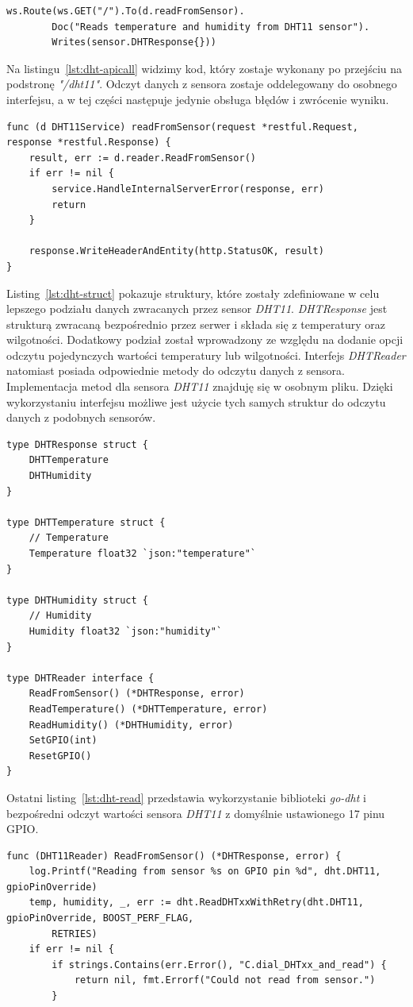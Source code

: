\documentclass[12pt]{report}
\begin{document}
{\begin{lstlisting}[language=golang,caption=Konfiguracja API,label=lst:dht-api]
	ws.Route(ws.GET("/").To(d.readFromSensor).
		Doc("Reads temperature and humidity from DHT11 sensor").
		Writes(sensor.DHTResponse{}))
\end{lstlisting}

\noindent Na listingu~\ref{lst:dht-apicall} widzimy kod, który zostaje wykonany po przejściu na podstronę \textit{"/dht11"}. Odczyt danych z sensora zostaje oddelegowany do osobnego interfejsu, a w tej części następuje jedynie obsługa błędów i zwrócenie wyniku.
\begin{lstlisting}[language=golang,caption=Wywołanie kodu API,label=lst:dht-apicall]
func (d DHT11Service) readFromSensor(request *restful.Request, response *restful.Response) {
	result, err := d.reader.ReadFromSensor()
	if err != nil {
		service.HandleInternalServerError(response, err)
		return
	}

	response.WriteHeaderAndEntity(http.StatusOK, result)
}
\end{lstlisting}

\noindent Listing~\ref{lst:dht-struct} pokazuje struktury, które zostały zdefiniowane w celu lepszego podziału danych zwracanych przez sensor \textit{DHT11}. \textit{DHTResponse} jest strukturą zwracaną bezpośrednio przez serwer i składa się z temperatury oraz wilgotności. Dodatkowy podział został wprowadzony ze względu na dodanie opcji odczytu pojedynczych wartości temperatury lub wilgotności. Interfejs \textit{DHTReader} natomiast posiada odpowiednie metody do odczytu danych z sensora. Implementacja metod dla sensora \textit{DHT11} znajduję się w osobnym pliku. Dzięki wykorzystaniu interfejsu możliwe jest użycie tych samych struktur do odczytu danych z podobnych sensorów.
\begin{lstlisting}[language=golang,caption=Struktury odpowiedzi serwera,label=lst:dht-struct]
type DHTResponse struct {
	DHTTemperature
	DHTHumidity
}

type DHTTemperature struct {
	// Temperature
	Temperature float32 `json:"temperature"`
}

type DHTHumidity struct {
	// Humidity
	Humidity float32 `json:"humidity"`
}

type DHTReader interface {
	ReadFromSensor() (*DHTResponse, error)
	ReadTemperature() (*DHTTemperature, error)
	ReadHumidity() (*DHTHumidity, error)
	SetGPIO(int)
	ResetGPIO()
}
\end{lstlisting}

\noindent Ostatni listing~\ref{lst:dht-read} przedstawia wykorzystanie biblioteki \textit{go-dht} i bezpośredni odczyt wartości sensora \textit{DHT11} z domyślnie ustawionego 17 pinu GPIO.
\begin{lstlisting}[language=golang,caption=Odczyt danych z sensora DHT11,label=lst:dht-read]
func (DHT11Reader) ReadFromSensor() (*DHTResponse, error) {
	log.Printf("Reading from sensor %s on GPIO pin %d", dht.DHT11, gpioPinOverride)
	temp, humidity, _, err := dht.ReadDHTxxWithRetry(dht.DHT11, gpioPinOverride, BOOST_PERF_FLAG,
		RETRIES)
	if err != nil {
		if strings.Contains(err.Error(), "C.dial_DHTxx_and_read") {
			return nil, fmt.Errorf("Could not read from sensor.")
		}


\end{lstlisting}}
\end{document}
